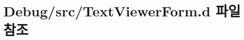 \hypertarget{_text_viewer_form_8d}{\section{Debug/src/\+Text\+Viewer\+Form.d 파일 참조}
\label{_text_viewer_form_8d}
}
